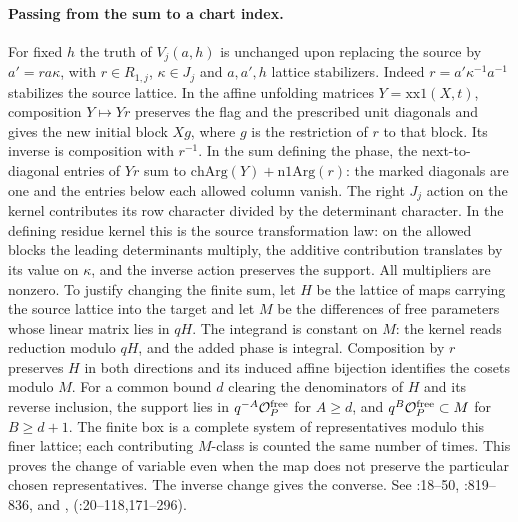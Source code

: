 \paragraph{Passing from the sum to a chart index.} For fixed $h$ the truth of $V_j(a,h)$ is unchanged upon
replacing the source by $a'=r a\kappa$, with $r\in R_{1,j}$,
$\kappa\in J_j$ and $a,a',h$ lattice stabilizers.
Indeed $r=a'\kappa^{-1}a^{-1}$ stabilizes the source lattice. In
the affine unfolding matrices $Y=\mathrm{xx1}(X,t)$, composition
$Y\mapsto Yr$ preserves the flag and the prescribed unit diagonals
and gives the new initial block $Xg$, where $g$ is the restriction
of $r$ to that block. Its inverse is composition with $r^{-1}$.
In the sum defining the phase, the next-to-diagonal entries of $Yr$
sum to $\mathrm{chArg}(Y)+\mathrm{n1Arg}(r)$: the marked
diagonals are one and the entries below each allowed column vanish.
The right $J_j$ action on the kernel contributes its row character
divided by the determinant character. In the defining residue kernel
this is the source transformation law: on the allowed blocks the
leading determinants multiply, the additive contribution translates
by its value on $\kappa$, and the inverse action preserves the
support. All multipliers are nonzero. To justify changing the finite
sum, let $H$ be the lattice of maps carrying the source lattice into
the target and let $M$ be the differences of free parameters whose
linear matrix lies in $qH$. The integrand is constant on $M$: the
kernel reads reduction modulo $qH$, and the added phase is integral.
Composition by $r$ preserves $H$ in both directions and its induced
affine bijection identifies the cosets modulo $M$. For a common bound
$d$ clearing the denominators of $H$ and its reverse inclusion, the
support lies in $q^{-A}\mathcal O_P^{\rm free}$ for $A\ge d$, and
$q^B\mathcal O_P^{\rm free}\subset M$ for $B\ge d+1$. The finite
box is a complete system of representatives modulo this finer lattice;
each contributing $M$-class is counted the same number of times.
This proves the change of variable even when the map does not
preserve the particular chosen representatives. The inverse change
gives the converse. See :18--50,
:819--836, and
, 
(:20--118,171--296).

